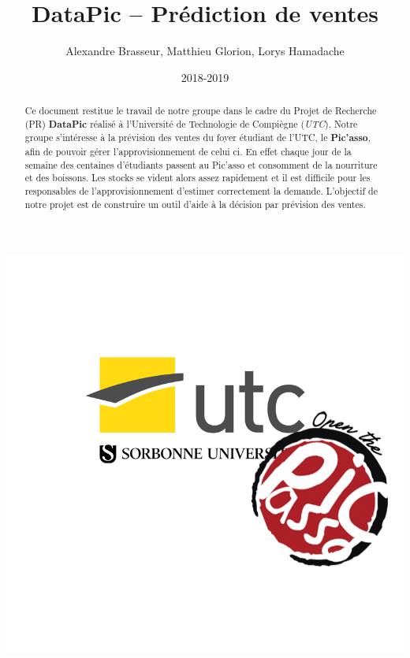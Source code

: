 \documentclass[a4paper,twoside,12pt]{article}
\title{DataPic – Prédiction de ventes}
\author{Alexandre Brasseur, Matthieu Glorion, Lorys Hamadache}
\date{2018-2019}
\begin{document}
\maketitle
\begin{center}
    \includegraphics[width=\linewidth]{figures/logo.png}
\end{center}
\thispagestyle{empty}
\clearpage

\null
\thispagestyle{empty}
\newpage

\tableofcontents
\thispagestyle{empty}
\clearpage

\thispagestyle{fancy}
\begin{abstract}
Ce document restitue le travail de notre groupe dans le cadre du Projet de Recherche (PR) \textbf{DataPic} réalisé à l'Université de Technologie de Compiègne (\emph{UTC}). Notre groupe s'intéresse à la prévision des ventes du foyer étudiant de l'UTC, le \textbf{Pic’asso}, afin de pouvoir gérer l'approvisionnement de celui ci.
En effet chaque jour de la semaine des centaines d'étudiants passent au Pic'asso et consomment de la nourriture et des boissons. Les stocks se vident alors assez rapidement et il est difficile pour les responsables de l'approvisionnement d'estimer correctement la demande. L'objectif de notre projet est de construire un outil d'aide à la décision par prévision des ventes.
\end{abstract}
\clearpage
\end{document}
